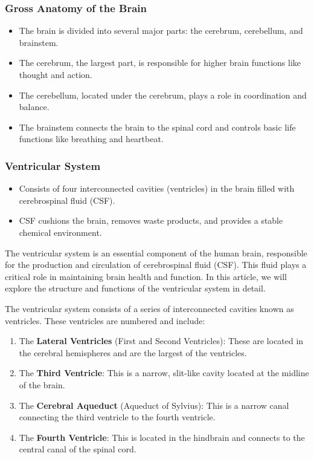 \documentclass{article}
\begin{document}
\subsubsection{Gross Anatomy of the Brain}
\begin{itemize}
    \item The brain is divided into several major parts: the cerebrum, cerebellum, and brainstem.
    \item The cerebrum, the largest part, is responsible for higher brain functions like thought and action.
    \item The cerebellum, located under the cerebrum, plays a role in coordination and balance.
    \item The brainstem connects the brain to the spinal cord and controls basic life functions like breathing and heartbeat.
\end{itemize}

\subsubsection{Ventricular System}
\begin{itemize}
    \item Consists of four interconnected cavities (ventricles) in the brain filled with cerebrospinal fluid (CSF).
    \item CSF cushions the brain, removes waste products, and provides a stable chemical environment.
\end{itemize}
The ventricular system is an essential component of the human brain, responsible for the production and circulation of cerebrospinal fluid (CSF). This fluid plays a critical role in maintaining brain health and function. In this article, we will explore the structure and functions of the ventricular system in detail.

The ventricular system consists of a series of interconnected cavities known as ventricles. These ventricles are numbered and include:

\begin{enumerate}
  \item The \textbf{Lateral Ventricles} (First and Second Ventricles): These are located in the cerebral hemispheres and are the largest of the ventricles.
  \item The \textbf{Third Ventricle}: This is a narrow, slit-like cavity located at the midline of the brain.
  \item The \textbf{Cerebral Aqueduct} (Aqueduct of Sylvius): This is a narrow canal connecting the third ventricle to the fourth ventricle.
  \item The \textbf{Fourth Ventricle}: This is located in the hindbrain and connects to the central canal of the spinal cord.
\end{enumerate}
\end{document}

